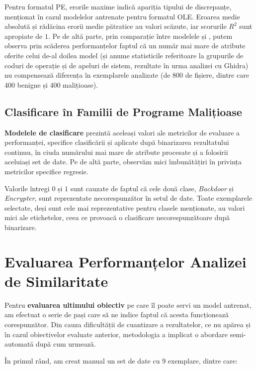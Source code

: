 \documentclass[../../main.tex]{subfiles}
\begin{document}
Pentru formatul PE, erorile maxime indică apariția tipului de discrepanțe, menționat în cazul modelelor antrenate pentru formatul OLE. Eroarea medie absolută și rădăcina erorii medie pătratice au valori scăzute, iar scorurile $ R^2 $ sunt apropiate de $ 1 $. Pe de altă parte, prin comparație între modelele  și , putem observa prin scăde\-rea performanțelor faptul că un număr mai mare de atribute oferite celui de-al doilea model (și anume statisticile referitoare la grupurile de coduri de operație și de apeluri de sistem, rezultate în urma analizei cu Ghidra) nu compensează diferența în exemplarele analizate (de 800 de fișiere, dintre care 400 benigne și 400 malițioase).

\subsection{Clasificare în Familii de Programe Malițioase}

\textbf{Modelele de clasificare} prezintă aceleași valori ale metricilor de evaluare a perfor\-manței, specifice clasificării și aplicate după binarizarea rezultatului continuu, în ciuda numărului mai mare de atribute procesate și a folosirii aceluiași set de date. Pe de altă parte, observăm mici îmbunătățiri în privința metricilor specifice regresie.

Valorile întregi $ 0 $ și $ 1 $ sunt cauzate de faptul că cele două clase, \textit{Backdoor} și \textit{Encrypter}, sunt reprezentate necorespunzător în setul de date. Toate exemplarele selectate, deși sunt cele mai reprezentative pentru clasele menționate, au valori mici ale etichetelor, ceea ce provoacă o clasificare necorespunzătoare după binarizare.

\section{Evaluarea Performanțelor Analizei de Similaritate}
\label{sec:evaluation_similarity_evaluation}

Pentru \textbf{evaluarea ultimului obiectiv} pe care îl poate servi un model antrenat, am efectuat o serie de pași care să ne indice faptul că acesta funcționează corespunzător. Din cauza dificultății de cuantizare a rezultatelor, ce nu apărea și în cazul obiectivelor evaluate anterior, metodologia a implicat o abordare semi-automată după cum urmează.

\newpage

În primul rând, am creat manual un set de date cu 9 exemplare, dintre care:
\end{document}

